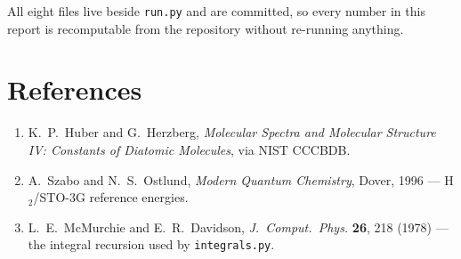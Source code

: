 \documentclass[11pt,a4paper]{article}
\newcommand{\code}[1]{\texttt{\small #1}}
\begin{document}
All eight files live beside \code{run.py} and are committed, so every number in
this report is recomputable from the repository without re-running anything.

\section*{References}
\small
\begin{enumerate}[leftmargin=1.4em,itemsep=0.1em]
\item K.\ P.\ Huber and G.\ Herzberg, \emph{Molecular Spectra and Molecular
  Structure IV: Constants of Diatomic Molecules}, via NIST CCCBDB.
\item A.\ Szabo and N.\ S.\ Ostlund, \emph{Modern Quantum Chemistry}, Dover,
  1996 --- H$_2$/STO-3G reference energies.
\item L.\ E.\ McMurchie and E.\ R.\ Davidson, \emph{J.\ Comput.\ Phys.}
  \textbf{26}, 218 (1978) --- the integral recursion used by
  \code{integrals.py}.
\end{enumerate}
\end{document}
